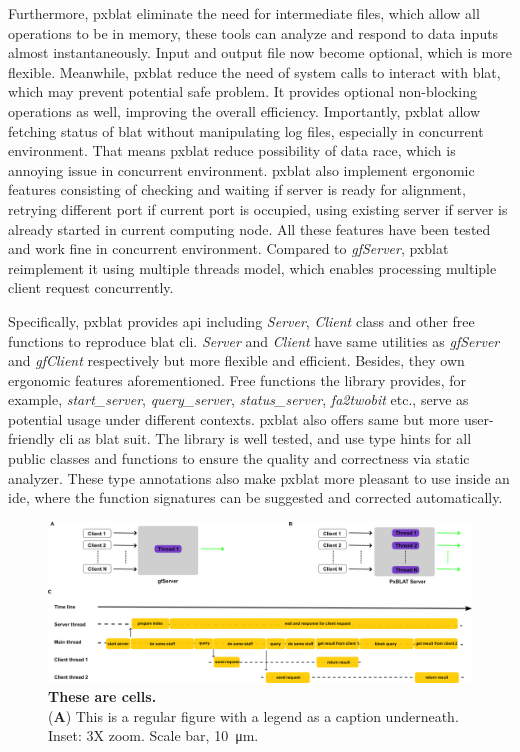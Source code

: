 Furthermore, \acrshort{pxblat} eliminate the need for intermediate files, which allow all operations to be in memory, these tools can analyze and respond to data inputs almost instantaneously.
Input and output file now become optional, which is more flexible.
Meanwhile, \acrshort{pxblat} reduce the need of system calls to interact with \acrshort{blat}, which may prevent potential safe problem.
It provides optional non-blocking operations as well, improving the overall efficiency.
Importantly, \acrshort{pxblat} allow fetching status of \acrshort{blat} without manipulating log files, especially in concurrent environment.
That means \acrshort{pxblat} reduce possibility of data race, which is annoying issue in concurrent environment.
\acrshort{pxblat} also implement ergonomic features consisting of checking and waiting if server is ready for alignment, retrying different port if current port is occupied, using existing server if server is already started in current computing node.
All these features have been tested and work fine in concurrent environment.
Compared to \emph{gfServer},  \acrshort{pxblat} reimplement it using multiple threads model, which enables processing multiple client request concurrently.

Specifically, \acrshort{pxblat} provides \acrfull{api} including  \emph{Server}, \emph{Client} class and other free functions to reproduce \acrshort{blat} \acrshort{cli}.
\emph{Server} and \emph{Client} have same utilities as \emph{gfServer} and \emph{gfClient} respectively but more flexible and efficient.
Besides, they own ergonomic features aforementioned.
Free functions the library provides, for example, \emph{start\_server}, \emph{query\_server}, \emph{status\_server}, \emph{fa2twobit} etc., serve as potential usage under different contexts.
\acrshort{pxblat} also offers same but more user-friendly \acrshort{cli} as \acrshort{blat} suit.
The library is well tested, and use type hints for all public classes and functions to ensure the quality and correctness via static analyzer.
These type annotations also make \acrshort{pxblat} more pleasant to use inside an \acrfull{ide}, where the function signatures can be suggested and corrected automatically.

\begin{figure}
	\centering
	\includegraphics[width=0.75\linewidth]{figures/pxblat.png}
	\caption{\textbf{These are cells.}\\
		(\textbf{A}) This is a regular figure with a legend as a caption underneath. Inset: 3X zoom. Scale bar, \SI{10}{\micro\meter}.}
	\label{fig:pxblat}
\end{figure}


